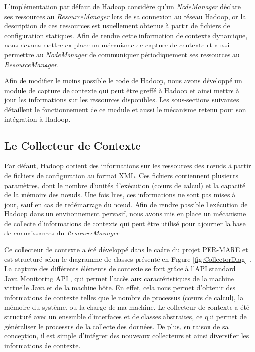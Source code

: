 L'implémentation par défaut de Hadoop considère qu'un \textit{NodeManager} déclare ses ressources au \textit{ResourceManager} lors de sa connexion au réseau Hadoop, or la description de ces ressources est usuellement obtenue à partir de fichiers de configuration statiques. Afin de rendre cette information de contexte dynamique, nous devons mettre en place un mécanisme de capture de contexte et aussi permettre au \textit{NodeManager} de communiquer périodiquement ses ressources au \textit{ResourceManager}. 

Afin de modifier le moins possible le code de Hadoop, nous avons développé un module de capture de contexte qui peut être greffé à Hadoop et ainsi mettre à jour les informations sur les ressources disponibles. Les sous-sections suivantes détaillent le fonctionnement de ce module et aussi le mécanisme retenu pour son intégration à Hadoop.

\subsection{Le Collecteur de Contexte\label{sec:gestionnairecontexte}}
Par défaut, Hadoop obtient des informations sur les ressources des n{\oe}uds à partir de fichiers de configuration au format XML. Ces fichiers contiennent plusieurs paramètres, dont le nombre d'unités d'exécution (c{\oe}urs de calcul) et la capacité de la mémoire des n{\oe}uds. Une fois lues, ces informations ne sont pas mises à jour, sauf en cas de redémarrage du n{\oe}ud. Afin de rendre possible l'exécution de Hadoop dans un environnement pervasif, nous avons mis en place un mécanisme de collecte d'informations de contexte qui peut être utilisé pour ajourner la base de connaissances du \textit{ResourceManager}.

Ce collecteur de contexte a été développé dans le cadre du projet PER-MARE\cite{PER-MARE} et est structuré selon le diagramme de classes présenté en Figure \ref{fig:CollectorDiag} \cite{UBICOMM2014}. La capture des différents éléments de contexte se font grâce à l'API standard Java Monitoring API \cite{Oracle}, qui permet l'accès aux caractéristiques de la machine virtuelle Java et de la machine hôte. En effet, cela nous permet d'obtenir des informations de contexte telles que le nombre de processus (c{\oe}urs de calcul), la mémoire du système, ou la charge de ma machine. Le collecteur de contexte a été structuré avec un ensemble d'interfaces et de classes abstraites, ce qui permet de généraliser le processus de la collecte des données. De plus, en raison de sa conception, il est simple d'intégrer des nouveaux collecteurs et ainsi diversifier les informations de contexte.

